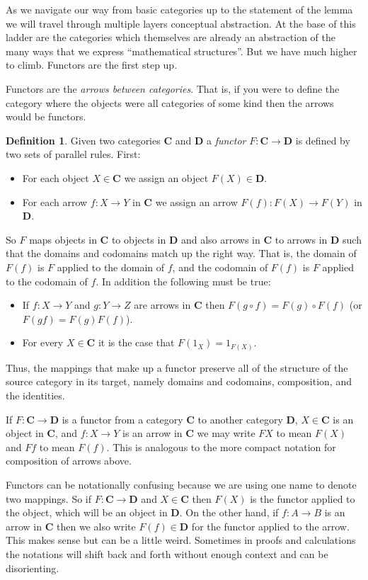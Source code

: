 \documentclass[12pt]{article}
\theoremstyle{definition}
\theoremstyle{definition}
\newtheorem{defn}{Definition}[]
\theoremstyle{definition}
\numberwithin{equation}{section}
\newcommand{\cat}[1]{\mathbf{#1}}      %
\newcommand{\CC}{\cat{C}}
\newcommand{\DD}{\cat{D}}
\def\ni{\goodbreak\noindent}
\begin{document}
As we navigate our way from basic categories up to the statement of the lemma we will
travel through multiple layers conceptual abstraction. At the base of this ladder
are the categories which themselves are already an abstraction of the many  ways
that we express ``mathematical structures''. But we have much higher to climb.
Functors are the first step up.

Functors are the {\it arrows between categories}. That is, if you were to define the
category where the objects were all categories of some kind then the arrows would be
functors.

\goodbreak
\begin{defn}
Given two categories $\CC$ and $\DD$ a {\it functor} $F : \CC \to \DD$ is defined by two
sets of parallel rules. First:
\begin{itemize}
\item For each object $X \in \CC$ we assign an object $F(X) \in \DD$.
\item For each arrow $f: X \to Y$ in $\CC$ we assign an arrow $F(f): F(X) \to F(Y)$ in
$\DD$.
\end{itemize}
\ni
So $F$ maps objects in $\CC$ to objects in $\DD$ and also arrows in $\CC$ to arrows in
$\DD$ such that the domains and codomains match up the right way. That is, the domain of
$F(f)$ is $F$ applied to the domain of $f$, and the codomain of $F(f)$ is $F$ applied to
the codomain of $f$. In addition the following must be true:
\begin{itemize}
\item If $f:X \to Y$ and $g: Y \to Z$ are arrows in $\CC$ then $F(g \circ f) = F(g) \circ
F(f)$ (or $F(gf) = F(g)F(f)$).
\item For every $X \in \CC$ it is the case that $F(1_X) = 1_{F(X)}$.
\end{itemize}

\end{defn}
\ni
Thus, the mappings that make up a functor preserve all of the structure of the source category
in its target, namely domains and codomains, composition, and the identities.

If $F: \CC \to \DD$ is a functor from a category $\CC$ to another category $\DD$,
$X \in \CC$ is an object in $\CC$, and $f: X \to Y$ is an arrow in $\CC$ we may write 
$F X$ to mean $F(X)$ and $Ff$ to mean $F(f)$.
This is analogous to the more compact notation for composition of arrows above.

Functors can be notationally confusing because we are using one name to denote two
mappings. So if $F: \CC \to \DD$ and $X \in \CC$ then $F(X)$ is the functor applied to the
object, which will be an object in $\DD$. On the other hand, if $f : A \to B$ is an arrow
in $\CC$ then we also write $F(f) \in \DD$ for the functor applied to the arrow. This makes
sense but can be a little weird. Sometimes in proofs and calculations the notations will 
shift back and forth without enough context and can be disorienting.
\end{document}
